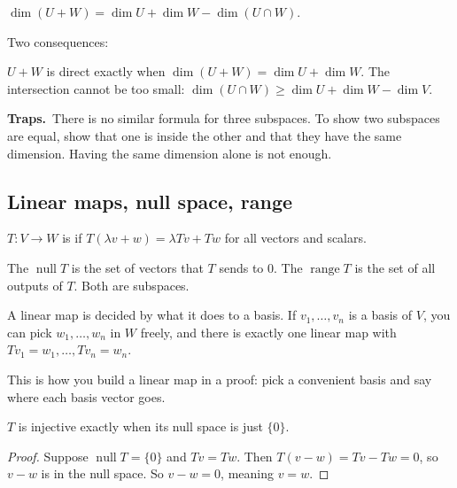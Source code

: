 \documentclass[11pt]{scrartcl}
\DeclareMathOperator{\nul}{null}
\DeclareMathOperator{\range}{range}
\newcommand{\traps}{\par\medskip\noindent\textbf{\color{RawSienna}Traps.}\ }
\begin{document}
\begin{theorem*}[LADR 2.43]
  $\dim(U+W)=\dim U+\dim W-\dim(U\cap W)$.

  Two consequences:
  \begin{itemize}
    \ii $U+W$ is direct exactly when $\dim(U+W)=\dim U+\dim W$.
    \ii The intersection cannot be too small: $\dim(U\cap W)\ge\dim U+\dim W-\dim V$.
  \end{itemize}
\end{theorem*}

\traps There is no similar formula for three subspaces.
To show two subspaces are equal, show that one is inside the other and that they have the same dimension. Having the same dimension alone is not enough.

\subsection{Linear maps, null space, range}
\begin{definition*}
  $T\colon V\to W$ is  if $T(\lambda v+w)=\lambda Tv+Tw$ for all vectors and scalars.

  The  $\nul T$ is the set of vectors that $T$ sends to $0$.
  The  $\range T$ is the set of all outputs of $T$.
  Both are subspaces.
\end{definition*}

\begin{proposition*}[LADR 3.4]
  A linear map is decided by what it does to a basis.
  If $v_1,\dots,v_n$ is a basis of $V$, you can pick $w_1,\dots,w_n$ in $W$ freely, and there is exactly one linear map with $Tv_1=w_1,\dots,Tv_n=w_n$.
\end{proposition*}
This is how you build a linear map in a proof: pick a convenient basis and say where each basis vector goes.

\begin{proposition*}[LADR 3.15]
  $T$ is injective exactly when its null space is just $\{0\}$.
\end{proposition*}
\begin{proof}
  Suppose $\nul T=\{0\}$ and $Tv=Tw$. Then $T(v-w)=Tv-Tw=0$, so $v-w$ is in the null space. So $v-w=0$, meaning $v=w$.
\end{proof}
\end{document}
